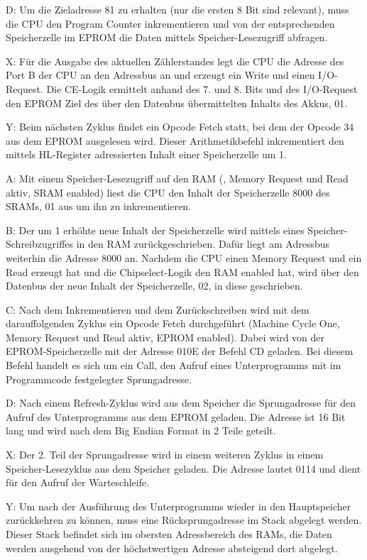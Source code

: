 D: Um die Zieladresse 81 zu erhalten (nur die ersten 8 Bit sind relevant), muss die CPU den Program Counter inkrementieren und von der entsprechenden Speicherzelle im EPROM die Daten mittels Speicher-Lesezugriff abfragen.

X: Für die Ausgabe des aktuellen Zählerstandes legt die CPU die Adresse des Port B der CPU an den Adressbus an und erzeugt ein Write und einen I/O-Request. Die CE-Logik ermittelt anhand des 7. und 8. Bits und des I/O-Request den EPROM Ziel des über den Datenbus übermittelten Inhalts des Akkus, 01.

Y: Beim nächsten Zyklus findet ein Opcode Fetch statt, bei dem der Opcode 34 aus dem EPROM ausgelesen wird. Dieser Arithmetikbefehl inkrementiert den mittels HL-Register adressierten Inhalt einer Speicherzelle um 1.

A: Mit einem Speicher-Lesezugriff auf den RAM (, Memory Request und Read aktiv, SRAM enabled) liest die CPU den Inhalt der Speicherzelle 8000 des SRAMs, 01 aus um ihn zu inkrementieren.

B: Der um 1 erhöhte neue Inhalt der Speicherzelle wird mittels eines Speicher-Schreibzugriffes in den RAM zurückgeschrieben. Dafür liegt am Adressbus weiterhin die Adresse 8000 an. Nachdem die CPU einen Memory Request und ein Read erzeugt hat und die Chipselect-Logik den RAM enabled hat, wird über den Datenbus der neue Inhalt der Speicherzelle, 02, in diese geschrieben.

C: Nach dem Inkrementieren und dem Zurückschreiben wird mit dem darauffolgenden Zyklus ein Opcode Fetch durchgeführt (Machine Cycle One, Memory Request und Read aktiv, EPROM enabled). Dabei wird von der EPROM-Speicherzelle mit der Adresse 010E der Befehl CD geladen. Bei diesem Befehl handelt es sich um ein Call, den Aufruf eines Unterprogramms mit im Programmcode festgelegter Sprungadresse.

D: Nach einem Refresh-Zyklus wird aus dem Speicher die Sprungadresse für den Aufruf des Unterprogramms aus dem EPROM geladen. Die Adresse ist 16 Bit lang und wird nach dem Big Endian Format in 2 Teile geteilt.

X: Der 2. Teil der Sprungadresse wird in einem weiteren Zyklus in einem Speicher-Lesezyklus aus dem Speicher geladen. Die Adresse lautet 0114 und dient für den Aufruf der Warteschleife.

Y: Um nach der Ausführung des Unterprogramms wieder in den Hauptspeicher zurückkehren zu können, muss eine Rücksprungadresse im Stack abgelegt werden. Dieser Stack befindet sich im obersten Adressbereich des RAMs, die Daten werden ausgehend von der höchstwertigen Adresse absteigend dort abgelegt.

